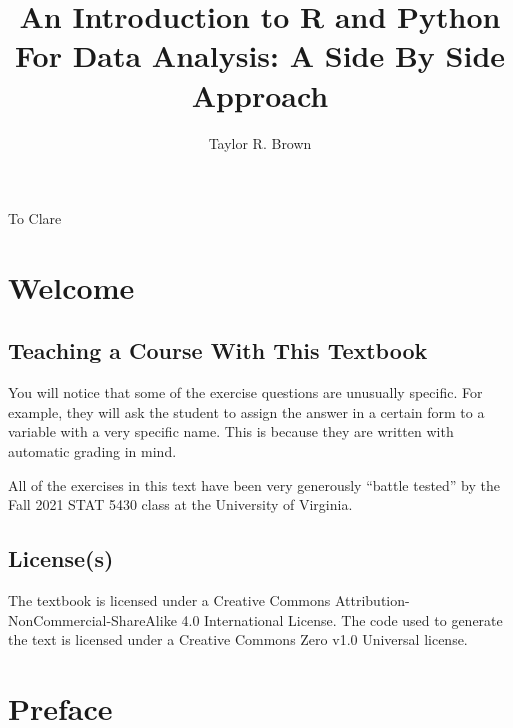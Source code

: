 \documentclass[
  12pt,
  krantz2]{krantz}
\title{An Introduction to R and Python For Data Analysis: A Side By Side Approach}
\author{Taylor R. Brown}
\date{}
\begin{document}
\maketitle


\thispagestyle{empty}

\begin{center}
To Clare
\end{center}

\setlength{\abovedisplayskip}{-5pt}
\setlength{\abovedisplayshortskip}{-5pt}

{
\setcounter{tocdepth}{2}
\tableofcontents
}
\listoftables
\listoffigures
\hypertarget{welcome}{%
\chapter*{Welcome}\label{welcome}}


\hypertarget{teaching-a-course-with-this-textbook}{%
\section*{Teaching a Course With This Textbook}\label{teaching-a-course-with-this-textbook}}


You will notice that some of the exercise questions are unusually specific. For example, they will ask the student to assign the answer in a certain form to a variable with a very specific name. This is because they are written with automatic grading in mind.

All of the exercises in this text have been very generously ``battle tested'' by the Fall 2021 STAT 5430 class at the University of Virginia.

\hypertarget{licenses}{%
\section*{License(s)}\label{licenses}}


The textbook is licensed under a Creative Commons Attribution-NonCommercial-ShareAlike 4.0 International License. The code used to generate the text is licensed under a Creative Commons Zero v1.0 Universal license.

\hypertarget{preface}{%
\chapter*{Preface}\label{preface}}
\end{document}
